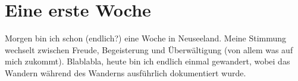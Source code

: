 \chapter{Eine erste Woche}

Morgen bin ich schon (endlich?) eine Woche in Neuseeland. Meine
Stimmung wechselt zwischen Freude, Begeisterung und Überwältigung (von
allem was auf mich zukommt). Blablabla, heute bin ich endlich einmal
gewandert, wobei das Wandern während des Wanderns ausführlich
dokumentiert wurde.
